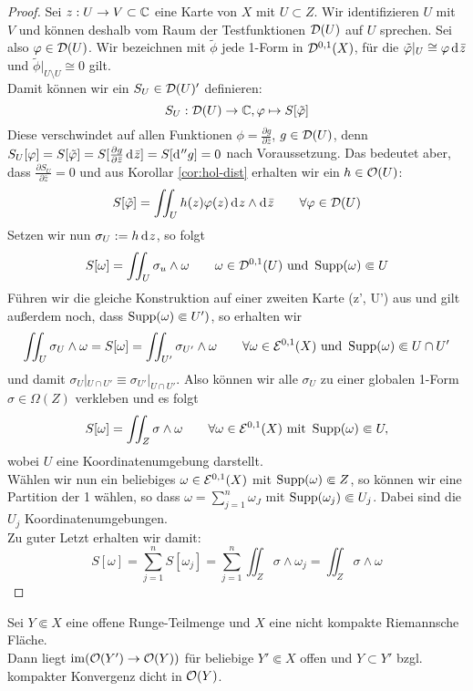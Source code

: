 \begin{proof}
  Sei $z: U \rightarrow V \subset \mathbb{C}$ eine Karte von $X$ mit $U \subset
  Z$. Wir identifizieren $U$ mit $V$ und können deshalb vom Raum der
  Testfunktionen $\mathcal{D}(U)$ auf $U$ sprechen. Sei also $\varphi \in
  \mathcal{D}(U)$. Wir bezeichnen mit $\tilde \phi$ jede 1-Form in
  $\mathcal{D}^{0,1}(X)$, für die $\tilde \phi|_U \cong \phi \d[\bar z]$ und
  $\tilde \phi |_{U \setminus U} \cong 0$ gilt. \\
  Damit können wir ein $S_U \in \mathcal{D}(U)'$ definieren:
  \[
  S_U: \mathcal{D}(U) \rightarrow \mathbb{C}, \varphi \mapsto S[\tilde {\varphi}]
  \]
  Diese verschwindet auf allen Funktionen $\phi = \frac{\partial
    g}{\partial \bar z}$, $g \in \mathcal{D}(U)$, denn $S_U[\phi] = S[\tilde
  \phi] = S[ \frac{\partial g}{\partial \bar z} \d[\bar z]] =
  S[\d[''g]] = 0$ nach Voraussetzung. Das bedeutet aber, dass
  $\frac{\partial S_U}{\partial \bar z} = 0$ und aus Korollar
  \ref{cor:hol-dist} erhalten wir ein $h \in \mathcal{O}(U)$:
  \[
  S[\tilde \phi] = \iint_U h(z) \phi(z) \d[z] \wedge \d[\bar z] \qquad
  \forall \phi \in \dist(U)
  \]
  Setzen wir nun $\sigma_U := h \d[z]$, so folgt
  \[
  S[\omega] = \iint_U \sigma_u \wedge \omega \qquad \omega \in
  \mathcal{D}^{0,1}(U) \text{ und } \operatorname{Supp}(\omega) \Subset U
  \]
  Führen wir die gleiche Konstruktion auf einer zweiten Karte (z', U')
  aus und gilt außerdem noch, dass $\operatorname{Supp}(\omega) \Subset U')$, so
  erhalten wir
  \[
  \iint_U \sigma_U \wedge \omega = S[\omega] = \iint_{U'} \sigma_{U'}
  \wedge \omega \qquad \forall \omega \in \mathcal{E}^{0,1}(X) \text{ und }
  \operatorname{Supp}(\omega) \Subset U \cap U'
  \]
  und damit $\sigma_U|_{U \cap U'} \equiv \sigma_{U'}|_{U \cap
    U'}$. Also können wir alle $\sigma_U$ zu einer globalen 1-Form
  $\sigma \in \Omega(Z)$ verkleben und es folgt
  \[
  S[\omega] = \iint_Z \sigma \wedge \omega \qquad \forall \omega \in
  \mathcal{E}^{0,1}(X) \text{ mit } \operatorname{Supp}(\omega) \Subset U,
  \]
  wobei $U$ eine Koordinatenumgebung darstellt. \\
  Wählen wir nun ein beliebiges $\omega \in \mathcal{E}^{0,1}(X)$ mit
  $\operatorname{Supp}(\omega) \Subset Z$, so können wir eine Partition der 1
  wählen, so dass $\omega = \sum_{j=1}^n \omega_J$ mit
  $\operatorname{Supp}(\omega_j) \Subset U_j$. Dabei sind die $U_j$
  Koordinatenumgebungen. \\
  Zu guter Letzt erhalten wir damit:
  \[
  S[\omega] = \sum_{j=1}^n S[\omega_j] = \sum_{j=1}^n \iint_Z \sigma
  \wedge \omega_j = \iint_Z \sigma \wedge \omega
  \]
\end{proof}

\begin{thm}
  \label{thm:runge-dicht}
  Sei $Y \Subset X$ eine offene Runge-Teilmenge und $X$ eine nicht
  kompakte Riemannsche Fläche. \\
  Dann liegt $\operatorname{im}( \mathcal{O}(Y') \rightarrow \mathcal{O}(Y))$ für beliebige $Y' \Subset X$
  offen und $Y \subset Y'$ bzgl. kompakter Konvergenz dicht in $\mathcal{O}(Y)$.
\end{thm}

